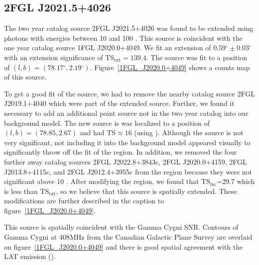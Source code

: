 \documentclass[12pt,preprint]{aastex}
\newcommand{\gev}{\text{GeV}\xspace}
\newcommand{\tsext}{{\ensuremath{\text{TS}_\text{ext}}}\xspace}
\newcommand{\tsinc}{\ensuremath{\text{TS}_\text{inc}}\xspace}
\newcommand{\ts}{\text{TS}\xspace}
\renewcommand{\deg}{\ensuremath{^\circ}\xspace}
\newcommand{\pointlike}{\text{\em pointlike}\xspace}
\begin{document}
\subsection{2FGL J2021.5+4026}
\label{section_2FGL J2021.5+4026}



The two year catalog source 2FGL J2021.5+4026 was found to be extended
using photons with energies between 10 \gev and 100 \gev. This source
is coincident with the one year catalog source 1FGL J2020.0+4049. We
fit an extension of $0.59\deg\pm0.03\deg$ with an extension
significance of $\tsext=139.4$.  The source was fit to a position of
$(l,b)=(78.17\deg,2.19\deg)$.  Figure~\ref{1FGL_J2020.0+4049} shows a
counts map of this source.

To get a good fit of the source, we had to remove the nearby catalog
source 2FGL J2019.1+4040 which were part of the extended source.
Further, we found it necessary to add an additional point source not in
the two year catalog into our background model.  The new source is was
localized to a position of $(l,b)=(78.85,2.67)$ and had $\ts\approx 16$
(using \pointlike).  Although the source is not very significant, not
including it into the background model appeared visually to significantly
throw off the fit of the region.  In addition, we removed the four
further away catalog sources 2FGL J2022.8+3843c, 2FGL J2020.0+4159,
2FGL J2013.8+4115c, and 2FGL J2012.4+3955c from the region because they
were not significant above 10 \gev.  After modifying the region, we found
that \tsinc=29.7 which is less than \tsext, so we believe that this
source is spatially extended.  These modifications are further described
in the caption to figure~\ref{1FGL_J2020.0+4049}.

This source is spatially coincident with the Gamma Cygni SNR.  Contours of
Gamma Cygni at 408MHz from the Canadian Galactic Plane Survey are overlaid
on figure~\ref{1FGL_J2020.0+4049} and there is good spatial agreement
with the LAT emission (\cite{canadian_galactic_plane_survey}).

\end{document}
